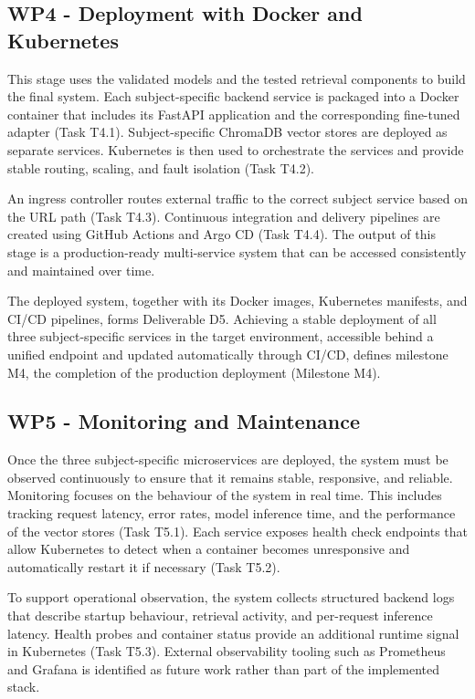 \subsection{WP4 - Deployment with Docker and Kubernetes}
This stage uses the validated models and the tested retrieval components to build the final system. Each subject-specific backend service is packaged into a Docker container that includes its FastAPI application and the corresponding fine-tuned adapter (Task T4.1). Subject-specific ChromaDB vector stores are deployed as separate services. Kubernetes is then used to orchestrate the services and provide stable routing, scaling, and fault isolation (Task T4.2).

An ingress controller routes external traffic to the correct subject service based on the URL path (Task T4.3). Continuous integration and delivery pipelines are created using GitHub Actions and Argo CD (Task T4.4). The output of this stage is a production-ready multi-service system that can be accessed consistently and maintained over time.

The deployed system, together with its Docker images, Kubernetes manifests, and CI/CD pipelines, forms Deliverable D5. Achieving a stable deployment of all three subject-specific services in the target environment, accessible behind a unified endpoint and updated automatically through CI/CD, defines milestone M4, the completion of the production deployment (Milestone M4).

\subsection{WP5 - Monitoring and Maintenance}
Once the three subject-specific microservices are deployed, the system must be observed continuously to ensure that it remains stable, responsive, and reliable. Monitoring focuses on the behaviour of the system in real time. This includes tracking request latency, error rates, model inference time, and the performance of the vector stores (Task T5.1). Each service exposes health check endpoints that allow Kubernetes to detect when a container becomes unresponsive and automatically restart it if necessary (Task T5.2).

To support operational observation, the system collects structured backend logs that describe startup behaviour, retrieval activity, and per-request inference latency. Health probes and container status provide an additional runtime signal in Kubernetes (Task T5.3). External observability tooling such as Prometheus and Grafana is identified as future work rather than part of the implemented stack.

